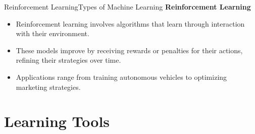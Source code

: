 \documentclass[11pt]{beamer}
\begin{document}
\begin{frame}{Reinforcement Learning}{Types of Machine Learning}
\textbf{Reinforcement Learning}

	\begin{itemize}
		\item Reinforcement learning involves algorithms that learn through interaction with their environment. 

		\item These models improve by receiving rewards or penalties for their actions, refining their strategies over time. 

		\item Applications range from training autonomous vehicles to optimizing marketing strategies. 
	\end{itemize}
\end{frame}
\section{Learning Tools}
%
\end{document}
